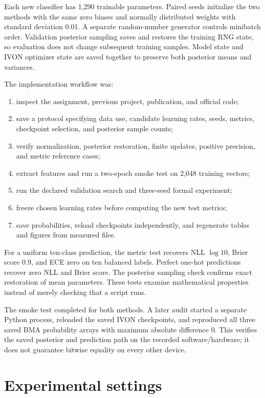 \documentclass[11pt,a4paper]{article}
\begin{document}
Each new classifier has 1,290 trainable parameters. Paired seeds initialize the
two methods with the same zero biases and normally distributed weights with
standard deviation 0.01. A separate random-number generator controls minibatch
order. Validation posterior sampling saves and restores the training RNG state,
so evaluation does not change subsequent training samples. Model state and IVON
optimizer state are saved together to preserve both posterior means and variances.

The implementation workflow was:
\begin{enumerate}[leftmargin=*]
\item inspect the assignment, previous project, publication, and official code;
\item save a protocol specifying data use, candidate learning rates, seeds,
metrics, checkpoint selection, and posterior sample counts;
\item verify normalization, posterior restoration, finite updates, positive
precision, and metric reference cases;
\item extract features and run a two-epoch smoke test on 2,048 training vectors;
\item run the declared validation search and three-seed formal experiment;
\item freeze chosen learning rates before computing the new test metrics;
\item save probabilities, reload checkpoints independently, and regenerate
tables and figures from measured files.
\end{enumerate}

For a uniform ten-class prediction, the metric test recovers NLL $\log 10$,
Brier score 0.9, and ECE zero on ten balanced labels. Perfect one-hot predictions
recover zero NLL and Brier score. The posterior sampling check confirms exact
restoration of mean parameters. These tests examine mathematical properties
instead of merely checking that a script runs.

The smoke test completed for both methods. A later audit started a separate
Python process, reloaded the saved IVON checkpoints, and reproduced all three
saved BMA probability arrays with maximum absolute difference $0$. This verifies
the saved posterior and prediction path on the recorded software/hardware;
it does not guarantee bitwise equality on every other device.

\section{Experimental settings}
\end{document}
